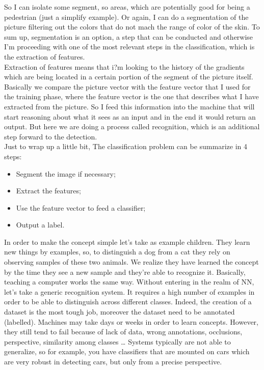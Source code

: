 So I can isolate some segment, so areas, which are potentially good for being a pedestrian (just a simplify example).
Or again, I can do a segmentation of the picture filtering out the colors that do not mach the range of color of the skin.
To sum up, segmentation is an option, a step that can be conducted and otherwise I'm proceeding with one of the most relevant steps in the classification, which is the extraction of features.
\\
Extraction of features means that i?m looking to the history of the gradients which are being located in a certain portion of the segment of the picture itself.
Basically we compare the picture vector with the feature vector that I used for the training phase, where the feature vector is the one that describes what I have extracted from the picture.
So I feed this information into the machine that will start reasoning about what it sees as an input and in the end it would return an output.
But here we are doing a process called recognition, which is an additional step forward to the detection.
\\
Just to wrap up a little bit, The classification problem can be summarize in 4 steps:
\begin{itemize}
    \item Segment the image if necessary;
    \item Extract the features;
    \item Use the feature vector to feed a classifier;
    \item Output a label.
\end{itemize}
In order to make the concept simple let's take as example children. They learn new things by examples, so, to distinguish a dog from a cat they rely on observing samples of these two animals. 
We realize they have learned the concept by the time they see a new sample and they’re able to recognize it.
Basically, teaching a computer works the same way.
Without entering in the realm of NN, let's take a generic recognition system. It requires a high number of examples in order to be able to distinguish across different classes.
Indeed, the creation of a dataset is the most tough job, moreover the dataset need to be annotated (labelled).
Machines may take days or weeks in order to learn concepts. However, they still tend to fail because of lack of data, wrong annotations, occlusions, perspective, similarity among classes \dots
Systems typically are not able to generalize, so for example, you have classifiers that are mounted on cars which are very robust in detecting cars, but only from a precise perspective.
